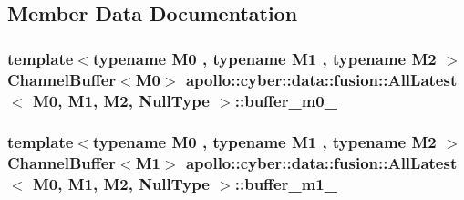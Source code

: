 \subsection{Member Data Documentation}
\hypertarget{classapollo_1_1cyber_1_1data_1_1fusion_1_1AllLatest_3_01M0_00_01M1_00_01M2_00_01NullType_01_4_a085490a2914d1ebe6fec256dff263b45}{
\subsubsection[{buffer\-\_\-m0\-\_\-}]{\setlength{\rightskip}{0pt plus 5cm}template$<$typename M0 , typename M1 , typename M2 $>$ {\bf Channel\-Buffer}$<$M0$>$ {\bf apollo\-::cyber\-::data\-::fusion\-::\-All\-Latest}$<$ M0, M1, M2, {\bf Null\-Type} $>$\-::buffer\-\_\-m0\-\_\-\hspace{0.3cm}{\ttfamily [private]}}}\label{classapollo_1_1cyber_1_1data_1_1fusion_1_1AllLatest_3_01M0_00_01M1_00_01M2_00_01NullType_01_4_a085490a2914d1ebe6fec256dff263b45}
\hypertarget{classapollo_1_1cyber_1_1data_1_1fusion_1_1AllLatest_3_01M0_00_01M1_00_01M2_00_01NullType_01_4_aaacbccd6888963ae0a62b23de2e2af37}{
\subsubsection[{buffer\-\_\-m1\-\_\-}]{\setlength{\rightskip}{0pt plus 5cm}template$<$typename M0 , typename M1 , typename M2 $>$ {\bf Channel\-Buffer}$<$M1$>$ {\bf apollo\-::cyber\-::data\-::fusion\-::\-All\-Latest}$<$ M0, M1, M2, {\bf Null\-Type} $>$\-::buffer\-\_\-m1\-\_\-\hspace{0.3cm}{\ttfamily [private]}}}\label{classapollo_1_1cyber_1_1data_1_1fusion_1_1AllLatest_3_01M0_00_01M1_00_01M2_00_01NullType_01_4_aaacbccd6888963ae0a62b23de2e2af37}
